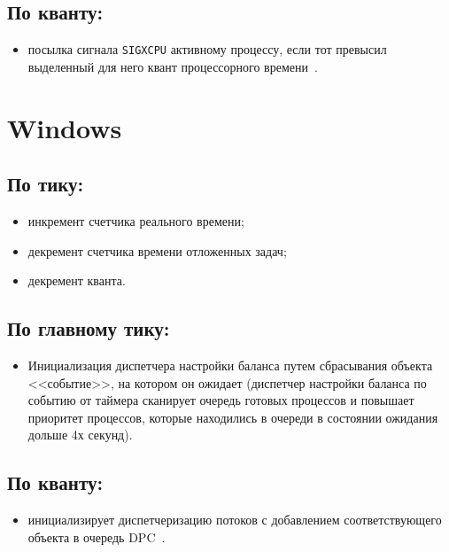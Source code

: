 \subsection*{По кванту:}

\begin{itemize}
\item посылка сигнала \texttt{SIGXCPU} активному процессу, если тот превысил выделенный для него квант процессорного времени~\cite{unix}.
\end{itemize}

\section{Windows}

\subsection*{По тику:}

\begin{itemize}[label=---]
\item инкремент счетчика реального времени;
\item декремент счетчика времени отложенных задач;
\item декремент кванта.
\end{itemize}

\subsection*{По главному тику:}

\begin{itemize}[label=---]
\item Инициализация диспетчера настройки баланса путем сбрасывания объекта <<событие>>, на котором он ожидает (диспетчер настройки баланса по событию от таймера сканирует очередь готовых процессов и повышает приоритет процессов, которые находились в очереди в состоянии ожидания дольше 4х секунд).
\end{itemize}

\subsection*{По кванту:}

\begin{itemize}[label=---]
	\item инициализирует диспетчеризацию потоков с добавлением соответствующего объекта в очередь DPC~\cite{win}.
\end{itemize}

